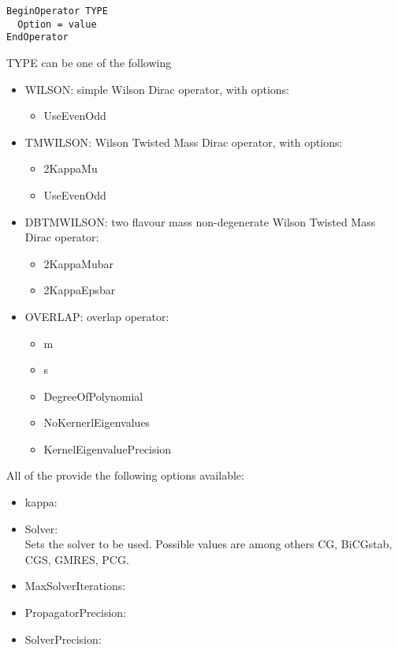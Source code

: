 \begin{verbatim}
BeginOperator TYPE
  Option = value
EndOperator
\end{verbatim}
{\ttfamily TYPE} can be one of the following
\begin{itemize}
\item {\ttfamily WILSON}: simple Wilson Dirac operator, with options:
  \begin{itemize}
  \item {\ttfamily UseEvenOdd}
  \end{itemize}
\item {\ttfamily TMWILSON}: Wilson Twisted Mass Dirac operator, with
  options:
  \begin{itemize}
  \item {\ttfamily 2KappaMu}
  \item {\ttfamily UseEvenOdd}
  \end{itemize}
\item {\ttfamily DBTMWILSON}: two flavour mass non-degenerate Wilson
  Twisted Mass Dirac operator:
  \begin{itemize}
  \item {\ttfamily 2KappaMubar}
  \item {\ttfamily 2KappaEpsbar}
  \end{itemize}
\item {\ttfamily OVERLAP}: overlap  operator:
  \begin{itemize}
  \item {\ttfamily m}
  \item {\ttfamily s}
  \item {\ttfamily DegreeOfPolynomial}
  \item {\ttfamily NoKernerlEigenvalues}
  \item {\ttfamily KernelEigenvaluePrecision}
  \end{itemize}
\end{itemize}
All of the provide the following options available:
\begin{itemize}
\item {\ttfamily kappa}:
\item {\ttfamily Solver}:\\
  Sets the solver to be used. Possible values are among others
  {\ttfamily CG, BiCGstab, CGS, GMRES, PCG}.
\item {\ttfamily MaxSolverIterations}:
\item {\ttfamily PropagatorPrecision}:
\item {\ttfamily SolverPrecision}:
\end{itemize}

